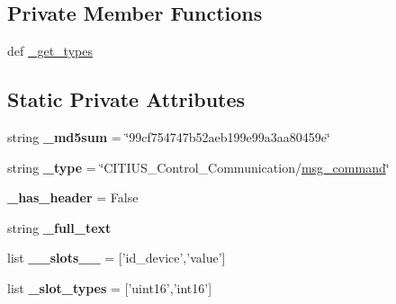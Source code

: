 \subsection*{\-Private \-Member \-Functions}
\begin{DoxyCompactItemize}
\item 
def \hyperlink{class_c_i_t_i_u_s___control___communication_1_1msg_1_1__msg__command_1_1msg__command_ae59cac747c49779d6dfc1639d07be197}{\-\_\-get\-\_\-types}
\end{DoxyCompactItemize}
\subsection*{\-Static \-Private \-Attributes}
\begin{DoxyCompactItemize}
\item 
\hypertarget{class_c_i_t_i_u_s___control___communication_1_1msg_1_1__msg__command_1_1msg__command_a5ca9133cadacfced607ebde6df640528}{string {\bfseries \-\_\-md5sum} = \char`\"{}99cf754747b52aeb199e99a3aa80459e\char`\"{}}\label{class_c_i_t_i_u_s___control___communication_1_1msg_1_1__msg__command_1_1msg__command_a5ca9133cadacfced607ebde6df640528}

\item 
\hypertarget{class_c_i_t_i_u_s___control___communication_1_1msg_1_1__msg__command_1_1msg__command_ac71bf6f5f846de843e41ac4273d13934}{string {\bfseries \-\_\-type} = \char`\"{}\-C\-I\-T\-I\-U\-S\-\_\-\-Control\-\_\-\-Communication/\hyperlink{class_c_i_t_i_u_s___control___communication_1_1msg_1_1__msg__command_1_1msg__command}{msg\-\_\-command}\char`\"{}}\label{class_c_i_t_i_u_s___control___communication_1_1msg_1_1__msg__command_1_1msg__command_ac71bf6f5f846de843e41ac4273d13934}

\item 
\hypertarget{class_c_i_t_i_u_s___control___communication_1_1msg_1_1__msg__command_1_1msg__command_aff4ea673bd82e091fcd8512bb114efc1}{{\bfseries \-\_\-has\-\_\-header} = \-False}\label{class_c_i_t_i_u_s___control___communication_1_1msg_1_1__msg__command_1_1msg__command_aff4ea673bd82e091fcd8512bb114efc1}

\item 
string {\bfseries \-\_\-full\-\_\-text}
\item 
\hypertarget{class_c_i_t_i_u_s___control___communication_1_1msg_1_1__msg__command_1_1msg__command_aab2887fa07a9f9ba7bfd617aaec65a77}{list {\bfseries \-\_\-\-\_\-slots\-\_\-\-\_\-} = \mbox{[}'id\-\_\-device','value'\mbox{]}}\label{class_c_i_t_i_u_s___control___communication_1_1msg_1_1__msg__command_1_1msg__command_aab2887fa07a9f9ba7bfd617aaec65a77}

\item 
\hypertarget{class_c_i_t_i_u_s___control___communication_1_1msg_1_1__msg__command_1_1msg__command_a2b67cd6bf1648f5a0f4e2600e64a2767}{list {\bfseries \-\_\-slot\-\_\-types} = \mbox{[}'uint16','int16'\mbox{]}}\label{class_c_i_t_i_u_s___control___communication_1_1msg_1_1__msg__command_1_1msg__command_a2b67cd6bf1648f5a0f4e2600e64a2767}

\end{DoxyCompactItemize}


